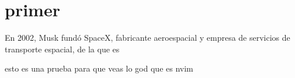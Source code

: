 \documentclass[a4paper,12pt]{article}
\begin{document}
\section{primer}
En 2002, Musk fundó SpaceX, fabricante aeroespacial y empresa de servicios de transporte espacial, de la que es

esto es una prueba para que veas lo god que es nvim

\end{document}
